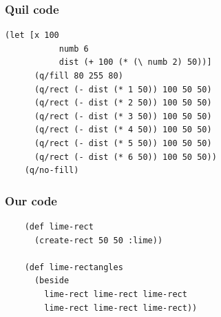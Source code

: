 \documentclass{beamer}
\begin{document}
\begin{frame}[fragile]
\frametitle{Quil code}
		\begin{verbatim}
(let [x 100
  		   numb 6
  		   dist (+ 100 (* (\ numb 2) 50))]
	  (q/fill 80 255 80)
	  (q/rect (- dist (* 1 50)) 100 50 50)
	  (q/rect (- dist (* 2 50)) 100 50 50)
	  (q/rect (- dist (* 3 50)) 100 50 50)
	  (q/rect (- dist (* 4 50)) 100 50 50)
	  (q/rect (- dist (* 5 50)) 100 50 50)
	  (q/rect (- dist (* 6 50)) 100 50 50))
	(q/no-fill)
		\end{verbatim}	

\end{frame}

\begin{frame}[fragile]
\frametitle{Our code}
	\begin{verbatim}
	(def lime-rect 
	  (create-rect 50 50 :lime))
	  
	(def lime-rectangles 
	  (beside 
	    lime-rect lime-rect lime-rect 
	    lime-rect lime-rect lime-rect))
	  						  
	\end{verbatim}
\end{frame}
\end{document}
